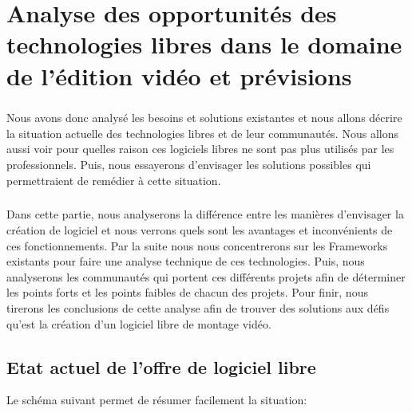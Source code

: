 \onehalfspacing \chapter{Analyse des opportunités des technologies
libres dans le domaine de l'édition vidéo et prévisions}

\minitoc \newpage

\doublespace

\paragraph{}

Nous avons donc analysé les besoins et solutions existantes et nous
allons décrire la situation actuelle des technologies libres et de leur
communautés.  Nous allons aussi voir pour quelles raison ces logiciels
libres ne sont pas plus utilisés par les professionnels. Puis, nous
essayerons d'envisager les solutions possibles qui permettraient de
remédier à cette situation.

\paragraph{}

Dans cette partie, nous analyserons la différence entre les manières
d'envisager la création de logiciel et nous verrons quels sont les
avantages et inconvénients de ces fonctionnements. Par la suite nous
nous concentrerons sur les Frameworks existants pour faire une analyse
technique de ces technologies. Puis, nous analyserons les communautés
qui portent ces différents projets afin de déterminer les points forts
et les points faibles de chacun des projets.  Pour finir, nous tirerons
les conclusions de cette analyse afin de trouver des solutions aux défis
qu'est la création d'un logiciel libre de montage vidéo.

\newpage

\section {Etat actuel de l'offre de logiciel libre}

Le schéma suivant permet de résumer facilement la situation:

